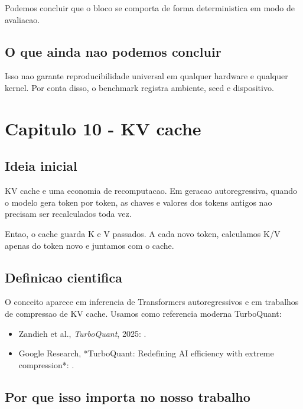 Podemos concluir que o bloco se comporta de forma deterministica em modo de avaliacao.



\subsection{O que ainda nao podemos concluir}




Isso nao garante reproducibilidade universal em qualquer hardware e qualquer kernel. Por conta disso, o benchmark registra ambiente, seed e dispositivo.



\section{Capitulo 10 - KV cache}



\subsection{Ideia inicial}





KV cache e uma economia de recomputacao. Em geracao autoregressiva, quando o modelo gera token por token, as chaves e valores dos tokens antigos nao precisam ser recalculados toda vez.




Entao, o cache guarda K e V passados. A cada novo token, calculamos K/V apenas do token novo e juntamos com o cache.



\subsection{Definicao cientifica}




O conceito aparece em inferencia de Transformers autoregressivos e em trabalhos de compressao de KV cache. Usamos como referencia moderna TurboQuant:


\begin{itemize}
\item Zandieh et al., \emph{TurboQuant}, 2025:
.
\item Google Research, *TurboQuant: Redefining AI efficiency with extreme
compression*:
.
\end{itemize}


\subsection{Por que isso importa no nosso trabalho}




